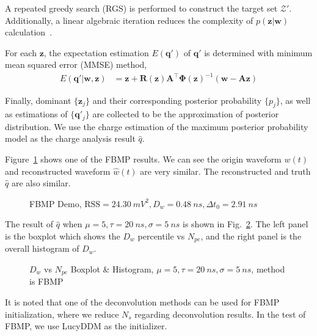 A repeated greedy search (RGS) is performed to construct the target set $\mathcal{Z}'$. Additionally, a linear algebraic iteration reduces the complexity of $p(\bm{z}|\bm{w})$ calculation~\cite{schniter_fast_nodate}. 

For each $\bm{z}$, the expectation estimation $E(\bm{q}')$ of $\bm{q}'$ is determined with minimum mean squared error (MMSE) method, 
\begin{align}
    E(\bm{q}'|\bm{w},\bm{z}) &= \bm{z} + \bm{R}(\bm{z})\bm{A}^\top\bm{\Phi}(\bm{z})^{-1}(\bm{w}-\bm{A}\bm{z})
\end{align}

Finally, dominant $\{\bm{z}_j\}$ and their corresponding posterior probability $\{p_j\}$, as well as estimations of $\{\bm{q}'_j\}$ are collected to be the approximation of posterior distribution. We use the charge estimation of the maximum posterior probability model as the charge analysis result $\hat{q}$. 

Figure~\ref{fig:fbmp} shows one of the FBMP results. We can see the origin waveform $w(t)$ and reconstructed waveform $\hat{w}(t)$ are very similar. The reconstructed and truth $\hat{q}$ are also similar. 

\begin{figure}[H]
    \centering
    \scalebox{0.4}{}
    \caption{\label{fig:fbmp} FBMP Demo, $\mathrm{RSS}=\SI{24.30}{mV^2},D_w=\SI{0.48}{ns},\Delta{t_0}=\SI{2.91}{ns}$}
\end{figure}

The result of $\hat{q}$ when $\mu=5, \tau=\SI{20}{ns}, \sigma=\SI{5}{ns}$ is shown in Fig.~\ref{fig:fbmp-npe}. The left panel is the boxplot which shows the $D_w$ percentile vs $N_{pe}$, and the right panel is the overall histogram of $D_w$. 

\begin{figure}[H]
    \centering
    \resizebox{0.5\textwidth}{!}{}
    \caption{\label{fig:fbmp-npe} $D_w$ vs $N_{pe}$ Boxplot \& Histogram, $\mu=5, \tau=\SI{20}{ns}, \sigma=\SI{5}{ns}$, method is FBMP}
\end{figure}

It is noted that one of the deconvolution methods can be used for FBMP initialization, where we reduce $N_s$ regarding deconvolution results. In the test of FBMP, we use LucyDDM as the initializer. 

